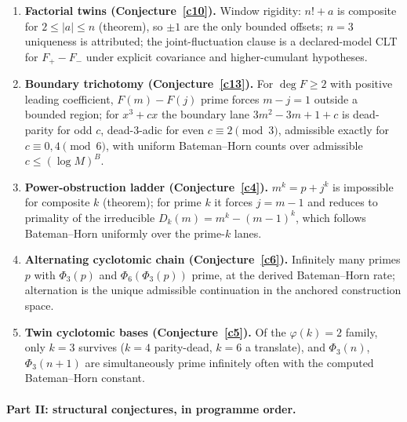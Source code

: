 \documentclass[11pt]{article}
\theoremstyle{definition}
\begin{document}
\begin{enumerate}
\item \textbf{Factorial twins (Conjecture~\ref{c10}).}  Window
rigidity: $n!+a$ is composite for $2\le|a|\le n$ (theorem), so
$\pm1$ are the only bounded offsets; $n=3$ uniqueness is attributed;
the joint-fluctuation clause is a declared-model CLT for
$F_+-F_-$ under explicit covariance and higher-cumulant
hypotheses.

\item \textbf{Boundary trichotomy (Conjecture~\ref{c13}).}  For
$\deg F\ge2$ with positive leading coefficient, $F(m)-F(j)$ prime
forces $m-j=1$ outside a bounded region; for $x^3+cx$ the boundary
lane $3m^2-3m+1+c$ is dead-parity for odd $c$, dead-$3$-adic for
even $c\equiv2\pmod3$, admissible exactly for $c\equiv0,4\pmod6$,
with uniform Bateman--Horn counts over admissible
$c\le(\log M)^B$.

\item \textbf{Power-obstruction ladder (Conjecture~\ref{c4}).}
$m^k=p+j^k$ is impossible for composite $k$ (theorem); for prime
$k$ it forces $j=m-1$ and reduces to primality of the irreducible
$D_k(m)=m^k-(m-1)^k$, which follows Bateman--Horn uniformly over
the prime-$k$ lanes.

\item \textbf{Alternating cyclotomic chain (Conjecture~\ref{c6}).}
Infinitely many primes $p$ with $\Phi_3(p)$ and
$\Phi_6(\Phi_3(p))$ prime, at the derived Bateman--Horn rate;
alternation is the unique admissible continuation in the anchored
construction space.

\item \textbf{Twin cyclotomic bases (Conjecture~\ref{c5}).}  Of the
$\varphi(k)=2$ family, only $k=3$ survives ($k=4$ parity-dead,
$k=6$ a translate), and $\Phi_3(n)$, $\Phi_3(n+1)$ are
simultaneously prime infinitely often with the computed
Bateman--Horn constant.

\end{enumerate}

\paragraph{Part II: structural conjectures, in programme order.}
\end{document}
